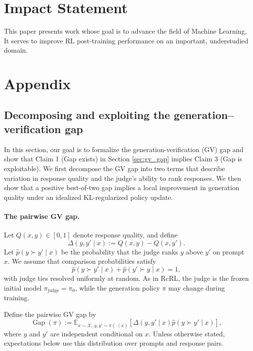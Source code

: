\documentclass{article}
\theoremstyle{plain}
\theoremstyle{definition}
\theoremstyle{remark}
\DeclareMathOperator{\gap}{Gap}
\begin{document}
\section*{Impact Statement}
This paper presents work whose goal is to advance the field of Machine
Learning. It serves to improve RL post-training performance on an important, understudied domain.





\newpage
\appendix
\onecolumn
\section{Appendix}








\subsection{Decomposing and exploiting the generation--verification gap}
\label{app:theory}

In this section, our goal is to formalize the generation-verification (GV) gap and show that Claim 1 (Gap exists) in Section \ref{sec:gv_gap} implies Claim 3 (Gap is exploitable). We first decompose the GV gap into two terms that describe variation in response quality and the judge's ability to rank responses. We then show that a positive best-of-two gap implies a local improvement in generation quality under an idealized KL-regularized policy update.

\paragraph{The pairwise GV gap.}
Let $Q(x,y)\in[0,1]$ denote response quality, and define
\[
  \Delta(y,y'\mid x):=Q(x,y)-Q(x,y').
\]
Let $\hat{p}(y\succ y'\mid x)$ be the probability that the judge ranks $y$ above $y'$ on prompt $x$. We assume that comparison probabilities satisfy
\[
  \hat{p}(y\succ y'\mid x)+\hat{p}(y'\succ y\mid x)=1,
\]
with judge ties resolved uniformly at random. As in RcRL, the judge is the frozen initial model $\pi_{\mathrm{judge}}=\pi_0$, while the generation policy $\pi$ may change during training.

Define the pairwise GV gap by
\begin{equation}
  \gap(\pi):=\mathbb{E}_{x\sim\mathcal{X},\,y,y'\sim\pi(\cdot\mid x)}
  \left[\Delta(y,y'\mid x)\hat{p}(y\succ y'\mid x)\right],
  \label{eq:app-pairwise-gap}
\end{equation}
where $y$ and $y'$ are independent conditional on $x$. Unless otherwise stated, expectations below use this distribution over prompts and response pairs.
\end{document}
